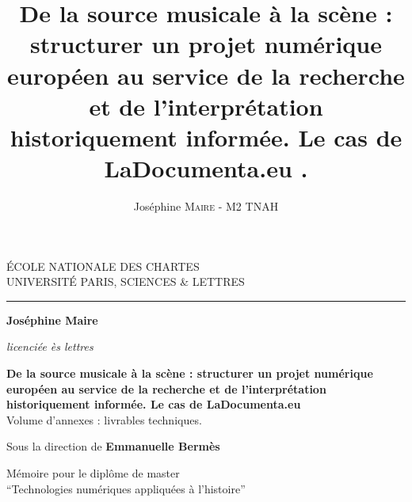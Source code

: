 \documentclass[12pt,twoside]{book}
\author{Joséphine \textsc{Maire} - M2 TNAH}
\title{De la source musicale à la scène : structurer un projet numérique européen au service de la recherche et de l'interprétation historiquement informée. Le cas de LaDocumenta.eu .}
\begin{document}
	\begin{titlepage}
		\begin{center}
			
			\bigskip
			
			\begin{large}				
				ÉCOLE NATIONALE DES CHARTES\\
				UNIVERSITÉ PARIS, SCIENCES \& LETTRES
			\end{large}
			\begin{center}\rule{2cm}{0.02cm}\end{center}
			
			\bigskip
			\bigskip
			\bigskip
			\begin{Large}
				\textbf{Joséphine Maire}\\
			\end{Large}
			\begin{normalsize} \textit{licenciée ès lettres}\\
			\end{normalsize}
			
			\bigskip
			\bigskip
			\bigskip
			
			\begin{Huge}
				\textbf{De la source musicale à la scène : structurer un projet numérique européen au service de la recherche et de l'interprétation historiquement informée. Le cas de LaDocumenta.eu}\\[1.5cm]
				Volume d'annexes : livrables techniques.\par
			\end{Huge}
			
			\bigskip
			\bigskip
			\begin{LARGE}
				
			\end{LARGE}
			
			\bigskip
			\bigskip
			\bigskip
			\begin{large}
				Sous la direction de \textbf{Emmanuelle Bermès}
			\end{large}
			\vfill
			
			\begin{large}
				Mémoire 
				pour le diplôme de master \\
				\enquote{Technologies numériques appliquées à l'histoire} \\
			\end{large}
			
		\end{center}
	\end{titlepage}
	
\end{document}
